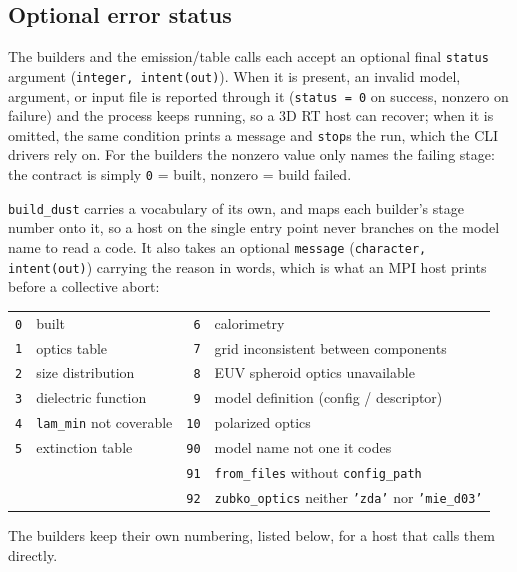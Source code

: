 \documentclass{my_memo}
\newcommand{\code}[1]{\texttt{#1}}
\begin{document}
\subsection{Optional error status}\label{sec:status}

The builders and the emission/table calls each accept an optional final
\code{status} argument (\code{integer, intent(out)}). When it is present, an
invalid model, argument, or input file is reported through it (\code{status = 0}
on success, nonzero on failure) and the process keeps running, so a 3D RT host
can recover; when it is omitted, the same condition prints a message and
\code{stop}s the run, which the CLI drivers rely on. For the builders the
nonzero value only names the failing stage: the contract is simply
\code{0} = built, nonzero = build failed.

\code{build\_dust} carries a vocabulary of its own, and maps each builder's
stage number onto it, so a host on the single entry point never branches on the
model name to read a code. It also takes an optional \code{message}
(\code{character, intent(out)}) carrying the reason in words, which is what an
MPI host prints before a collective abort:

\begin{center}
\begin{tabular}{rl rl}
\toprule
\code{0} & built                & \code{6}  & calorimetry \\
\code{1} & optics table         & \code{7}  & grid inconsistent between components \\
\code{2} & size distribution    & \code{8}  & EUV spheroid optics unavailable \\
\code{3} & dielectric function  & \code{9}  & model definition (config / descriptor) \\
\code{4} & \code{lam\_min} not coverable & \code{10} & polarized optics \\
\code{5} & extinction table     & \code{90} & model name not one it codes \\
         &                      & \code{91} & \code{from\_files} without \code{config\_path} \\
         &                      & \code{92} & \code{zubko\_optics} neither \code{'zda'} nor \code{'mie\_d03'} \\
\bottomrule
\end{tabular}
\end{center}

\noindent The builders keep their own numbering, listed below, for a host
that calls them directly.
\end{document}
